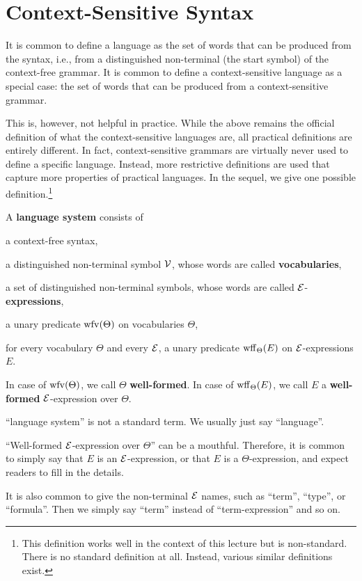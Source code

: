 \section{Context-Sensitive Syntax}

It is common to define a language as the set of words that can be produced from the syntax, i.e., from a distinguished non-terminal (the start symbol) of the context-free grammar.
It is common to define a context-sensitive language as a special case: the set of words that can be produced from a context-sensitive grammar.

This is, however, not helpful in practice.
While the above remains the official definition of what the context-sensitive languages are, all practical definitions are entirely different.
In fact, context-sensitive grammars are virtually never used to define a specific language.
Instead, more restrictive definitions are used that capture more properties of practical languages.
In the sequel, we give one possible definition.\footnote{This definition works well in the context of this lecture but is non-standard. There is no standard definition at all. Instead, various similar definitions exist.}

\begin{definition}
A \textbf{language system} consists of
\begin{compactitem}
 \item a context-free syntax,
 \item a distinguished non-terminal symbol $\mathcal{V}$, whose words are called \textbf{vocabularies},
 \item a set of distinguished non-terminal symbols, whose words are called $\mathcal{E}$-\textbf{expressions},
 \item a unary predicate $\mathrm{wfv}(\Theta)$ on vocabularies $\Theta$,
 \item for every vocabulary $\Theta$ and every $\mathcal{E}$, a unary predicate $\mathrm{wff}_{\Theta}(E)$ on $\mathcal{E}$-expressions $E$.
\end{compactitem}

In case of $\mathrm{wfv}(\Theta)$, we call $\Theta$ \textbf{well-formed}.
In case of $\mathrm{wff}_{\Theta}(E)$, we call $E$ a \textbf{well-formed} $\mathcal{E}$-expression over $\Theta$.
\end{definition}

\begin{remark}[Terminology]
``language system'' is not a standard term. We usually just say ``language''.

``Well-formed $\mathcal{E}$-expression over $\Theta$'' can be a mouthful.
Therefore, it is common to simply say that $E$ is an $\mathcal{E}$-expression, or that $E$ is a $\Theta$-expression, and expect readers to fill in the details.

It is also common to give the non-terminal $\mathcal{E}$ names, such as ``term'', ``type'', or ``formula''.
Then we simply say ``term'' instead of ``term-expression'' and so on.
\end{remark}

